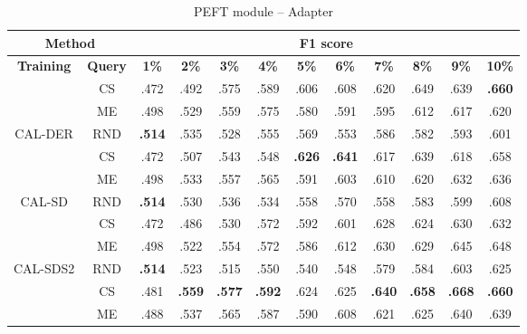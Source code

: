 \begin{table}[htbp]
\centering
\begin{subtable}{\linewidth}
\centering
\caption{PEFT module -- Adapter}

\begin{tabular}{c|c|cccccccccc}
\toprule
\multicolumn{2}{c|}{\textbf{Method}} & \multicolumn{10}{c}{\textbf{F1 score}} \\
\midrule
\textbf{Training} & \textbf{Query} & \textbf{1\%} & \textbf{2\%} & \textbf{3\%} & \textbf{4\%} & \textbf{5\%} & \textbf{6\%} & \textbf{7\%} & \textbf{8\%} & \textbf{9\%} & \textbf{10\%}\\
\midrule
 & CS & .472 & .492 & .575 & .589 & .606 & .608 & .620 & .649 & .639 & \textbf{.660}\\

 & ME & .498 & .529 & .559 & .575 & .580 & .591 & .595 & .612 & .617 & .620\\

\multirow{-3}{*}{\raggedright\arraybackslash CAL-DER} & RND & \textbf{.514} & .535 & .528 & .555 & .569 & .553 & .586 & .582 & .593 & .601\\
\midrule
 & CS & .472 & .507 & .543 & .548 & \textbf{.626} & \textbf{.641} & .617 & .639 & .618 & .658\\

 & ME & .498 & .533 & .557 & .565 & .591 & .603 & .610 & .620 & .632 & .636\\

\multirow{-3}{*}{\raggedright\arraybackslash CAL-SD} & RND & \textbf{.514} & .530 & .536 & .534 & .558 & .570 & .558 & .583 & .599 & .608\\
\midrule
 & CS & .472 & .486 & .530 & .572 & .592 & .601 & .628 & .624 & .630 & .632\\

 & ME & .498 & .522 & .554 & .572 & .586 & .612 & .630 & .629 & .645 & .648\\

\multirow{-3}{*}{\raggedright\arraybackslash CAL-SDS2} & RND & \textbf{.514} & .523 & .515 & .550 & .540 & .548 & .579 & .584 & .603 & .625\\
\midrule
 & CS & .481 & \textbf{.559} & \textbf{.577} & \textbf{.592} & .624 & .625 & \textbf{.640} & \textbf{.658} & \textbf{.668} & \textbf{.660}\\

 & ME & .488 & .537 & .565 & .587 & .590 & .608 & .621 & .625 & .640 & .639\\


\end{tabular}
\end{subtable}
\end{table}
